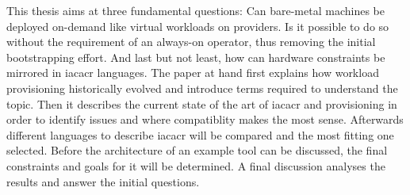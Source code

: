 \newline
This thesis aims at three fundamental questions: Can bare-metal machines be deployed on-demand like virtual workloads on providers. Is it possible to do so without the requirement of an always-on operator, thus removing the initial bootstrapping effort. And last but not least, how can hardware constraints be mirrored in \gls{iacacr} languages.
\newline
The paper at hand first explains how workload provisioning historically evolved and introduce terms required to understand the topic. Then it describes the current state of the art of \gls{iacacr} and provisioning in order to identify issues and where compatiblity makes the most sense. Afterwards different languages to describe \gls{iacacr} will be compared and the most fitting one selected.
Before the architecture of an example tool can be discussed, the final constraints and goals for it will be determined. A final discussion analyses the results and answer the initial questions.
